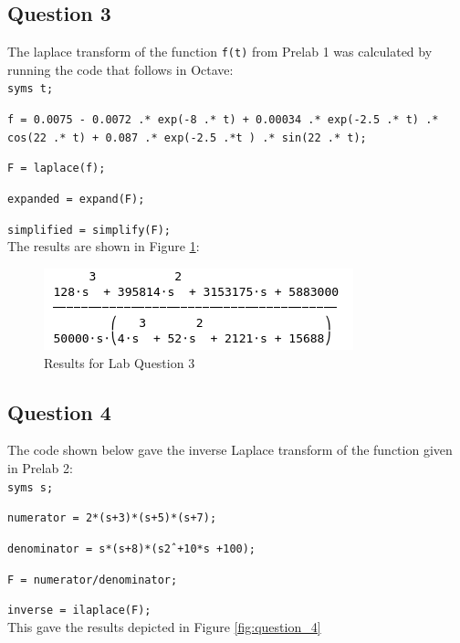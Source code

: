 \documentclass[12pt, a4paper]{article}
\begin{document}
	\subsection{Question 3}
	The laplace transform of the function \texttt{f(t)} from Prelab 1 was calculated by running the code that follows in Octave:\\
	
	\texttt{syms t;}\par
  	\texttt{f = 0.0075 - 0.0072 .* exp(-8 .* t) + 0.00034 .* exp(-2.5 .* t) .* cos(22 .* t) + 0.087 .* exp(-2.5 .*t ) .* sin(22 .* t);}\par
  	\texttt{F = laplace(f);}\par
  	\texttt{expanded = expand(F);}\par
  	\texttt{simplified = simplify(F);}\\

  	The results are shown in Figure \ref{fig:question_3}:\\

  	\begin{figure}[H]
		\centering
		\includegraphics[width=\textwidth]{question_3}
		\caption{Results for Lab Question 3}
		\label{fig:question_3}
	\end{figure}


	\subsection{Question 4}
	The code shown below gave the inverse Laplace transform of the function given in Prelab 2:\\

	\texttt{syms s;}\par
  	\texttt{numerator = 2*(s+3)*(s+5)*(s+7);}\par
  	\texttt{denominator = s*(s+8)*(s\^2 +10*s +100);}\par
  	\texttt{F = numerator/denominator;}\par
  	\texttt{inverse = ilaplace(F);}\\

  	This gave the results depicted in Figure \ref{fig:question_4} \\
\end{document}

